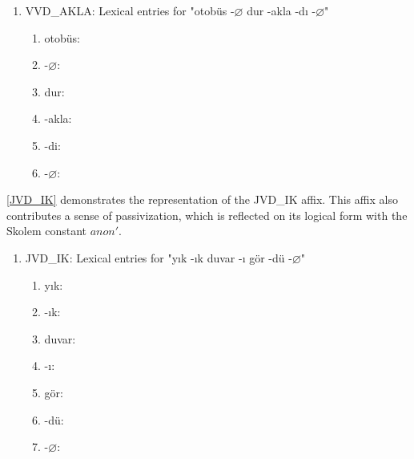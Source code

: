 \documentclass[11pt]{article} %
\begin{document}
\begin{enumerate}[resume*]
	\item VVD\_AKLA: Lexical entries for "otobüs -$\varnothing$ dur -akla -dı -$\varnothing$" \label{VVD_AKLA}
	\begin{enumerate}[label=(\alph*), ref=(\alph*)]\itemsep1pt
	\item otobüs: 
	\item -$\varnothing$: 
	\item dur: 
	\item -akla: 
	\item -di: 
	\item -$\varnothing$: 
	\end{enumerate}
\end{enumerate}

\ref{JVD_IK} demonstrates the representation of the JVD\_IK affix. This affix also contributes a sense of passivization, which is reflected on its logical form with the Skolem constant $anon'$.

\begin{enumerate}[resume*]
	\item JVD\_IK: Lexical entries for "yık -ık duvar -ı gör -dü -$\varnothing$" \label{JVD_IK}
	\begin{enumerate}[label=(\alph*), ref=(\alph*)]\itemsep1pt
	\item yık: 
	\item -ık: 
	\item duvar: 
	\item -ı: 
	\item gör: 
	\item -dü: 
	\item -$\varnothing$: 
	\end{enumerate}
\end{enumerate}
\end{document}
